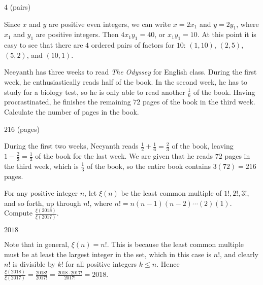 \documentclass[11pt]{article}
\begin{document}
\begin{answer}
$\boxed{4}$ (pairs)
\end{answer}

\begin{solution}
Since $x$ and $y$ are positive even integers, we can write $x = 2x_1$ and $y = 2y_1$, where 
$x_1$ and $y_1$ are positive integers. Then $4x_1y_1 = 40$, or $x_1y_1 = 10$. 
At this point it is easy to see that there are $\boxed{4}$ ordered pairs of factors for $10$:
$(1, 10)$, $(2, 5)$, $(5, 2)$, and $(10, 1)$.
\end{solution}


\begin{problem}
Neeyanth has three weeks to read \textit{The Odyssey} for English class. During the first week, 
he enthusiastically reads half of the book. In the second week, he has to study for a biology test, 
so he is only able to read another $\frac{1}{6}$ of the book. Having procrastinated, 
he finishes the remaining $72$ pages of the book in the third week. Calculate the number of pages in the book.
\end{problem}

\begin{answer}
$\boxed{216}$ (pages)
\end{answer}

\begin{solution}
During the first two weeks, Neeyanth reads $\frac{1}{2} + \frac{1}{6} = \frac{2}{3}$ of the book, leaving
$1 - \frac{2}{3} = \frac{1}{3}$ of the book for the last week. We are given that he reads $72$ pages in
the third week, which is $\frac{1}{3}$ of the book, so the entire book contains $3(72) = \boxed{216}$ pages.
\end{solution}


\begin{problem}%
For any positive integer $n$, let $\xi(n)$ be the least common multiple of $1!, 2!, 3!$, and so
forth, up through $n!$, where $n! = n(n-1)(n-2) \cdots (2)(1)$. Compute $\frac{\xi(2018)}{\xi(2017)}$.
\end{problem}

\begin{answer}
$\boxed{2018}$
\end{answer}

\begin{solution}
Note that in general, $\xi(n) = n!$. This is because the least common multiple must be at least
the largest integer in the set, which in this case is $n!$, and clearly $n!$ is divisible
by $k!$ for all positive integers $k \le n$. Hence $\frac{\xi(2018)}{\xi(2017)} =
\frac{2018!}{2017!} = \frac{2018 \cdot 2017!}{2017!} = \boxed{2018}$.
\end{solution}
\end{document}

